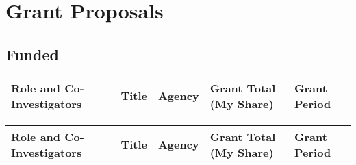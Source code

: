 \section*{Grant Proposals}

\subsection*{Funded}%

\ifdefined\iscockrell
{\footnotesize
  \begin{center}
    \begin{longtable}{p{1.7cm}p{6.5cm}p{3cm}P{1.5cm}p{1.0cm}}
      \centering\textbf{Role and} \newline \textbf{Co-Investigators}  & \centering\textbf{Title} & \centering\textbf{Agency} & \centering\textbf{Grant Total} \newline \textbf{(My Share)} & \textbf{Grant Period} \\
      \midrule
      
      \bottomrule
    \end{longtable}
  \end{center}
}
\else
\ifdefined\ispdf
{\footnotesize
  \begin{center}
    \begin{longtable}{p{1.7cm}p{6.5cm}p{3cm}P{1.5cm}p{1.0cm}}
      \centering\textbf{Role and} \newline \textbf{Co-Investigators}  & \centering\textbf{Title} & \centering\textbf{Agency} & \centering\textbf{Grant Total} \newline \textbf{(My Share)} & \textbf{Grant Period} \\
      \midrule
      
      \bottomrule
    \end{longtable}
  \end{center}
}
\fi


